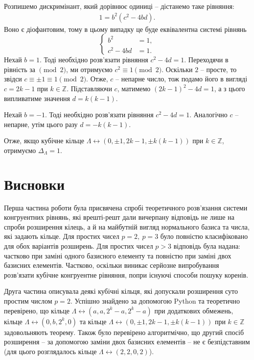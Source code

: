 \documentclass{thesis}
\begin{document}
Розпишемо дискримінант, який дорівнює одиниці -- дістанемо таке рівняння:
\begin{align*}
1 = b^2(c^2 - 4bd).
\end{align*}
Воно є діофантовим, тому в цьому випадку це буде еквівалентна системі рівнянь
\begin{equation*}
\begin{cases}
b^2 & = 1, \\
c^2 - 4bd & = 1.
\end{cases}
\end{equation*}
Нехай $b = 1$. Тоді необхідно розв'язати рівняння $c^2 - 4d = 1$. Переходячи в рівність за $\pmod 2$, ми отримуємо $c^2 \equiv 1 \pmod 2$. Оскільки $2$ -- просте, то звідси $c \equiv \pm 1 \equiv 1 \pmod 2$. Отже, $c$ -- непарне число, тож подамо його в вигляді $c = 2k-1$ при $k \in \mathbb{Z}$. Підставляючи $c$, матимемо $(2k-1)^2 - 4d = 1$, а з цього випливатиме значення $d = k(k-1)$.

Нехай $b = -1$. Тоді необхідно розв'язати рівняння $c^2 - 4d = 1$. Аналогічно $c$ -- непарне, утім цього разу $d = -k(k-1)$.

Отже, якщо кубічне кільце $\Lambda \leftrightarrow (0,\pm 1, 2k-1, \pm k(k-1))$ при $k \in \mathbb{Z}$, отримуємо $\Delta_\Lambda = 1$.
\newpage

\chapter*{Висновки}

Перша частина роботи була присвячена спробі теоретичного розв'язання системи конгруентних рівнянь, які врешті-решт дали вичерпану відповідь не лише на спроби розширення кілець, а й на майбутній вигляд нормального базиса та числа, які задають кільце. Для простих чисел $p = 2,\ p = 3$ було повністю класифіковано для обох варіантів розширень. Для простих чисел $p > 3$ відповідь була надана: частково при заміні одного базисного елементу та повністю при заміні двох базисних елементів. Частково, оскільки виникає серйозне випробування розв'язати кубічне конгруентне рівняння, попри існуючі способи пошуку коренів.

Друга частина описувала деякі кубічні кільця, які допускали розширення суто простим числом $p =2$. Успішно знайдено за допомогою Python та теоретично перевірено, що кільце $\Lambda \leftrightarrow (a,a,2^k-a,2^k-a)$ при додаткових обмежень, кільце $\Lambda \leftrightarrow (0,b,2^k,0)$ та кільце $\Lambda \leftrightarrow (0, \pm 1, 2k-1, \pm k(k-1))$ при $k \in \mathbb{Z}$ задовольняють теорему. Також було перевірено алгоритмічно, що другий спосіб розширення -- за допомогою заміни двох базисних елементів -- не є безпідставним (для цього розглядалось кільце $\Lambda \leftrightarrow (2,2,0,2)$).
\end{document}
